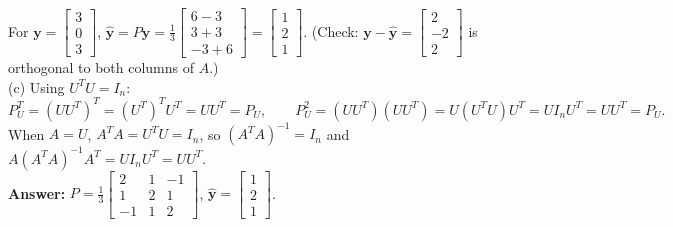 \documentclass[11pt, letterpaper]{article}
\theoremstyle{definition}
\theoremstyle{remark}
\begin{document}
For $\mathbf{y} = \begin{bmatrix} 3 \\ 0 \\ 3 \end{bmatrix}$, $\hat{\mathbf{y}} = P\mathbf{y} = \frac{1}{3}\begin{bmatrix} 6 - 3 \\ 3 + 3 \\ -3 + 6 \end{bmatrix} = \begin{bmatrix} 1 \\ 2 \\ 1 \end{bmatrix}$. (Check: $\mathbf{y} - \hat{\mathbf{y}} = \begin{bmatrix} 2 \\ -2 \\ 2 \end{bmatrix}$ is orthogonal to both columns of $A$.) \\
(c) Using $U^T U = I_n$:
\[
P_U^T = (U U^T)^T = (U^T)^T U^T = U U^T = P_U, \qquad
P_U^2 = (U U^T)(U U^T) = U(U^T U)U^T = U I_n U^T = U U^T = P_U.
\]
When $A = U$, $A^T A = U^T U = I_n$, so $(A^T A)^{-1} = I_n$ and $A(A^T A)^{-1}A^T = U I_n U^T = U U^T$. \\
\textbf{Answer:} $P = \frac{1}{3}\begin{bmatrix} 2 & 1 & -1 \\ 1 & 2 & 1 \\ -1 & 1 & 2 \end{bmatrix}$, $\hat{\mathbf{y}} = \begin{bmatrix} 1 \\ 2 \\ 1 \end{bmatrix}$.
\end{document}
